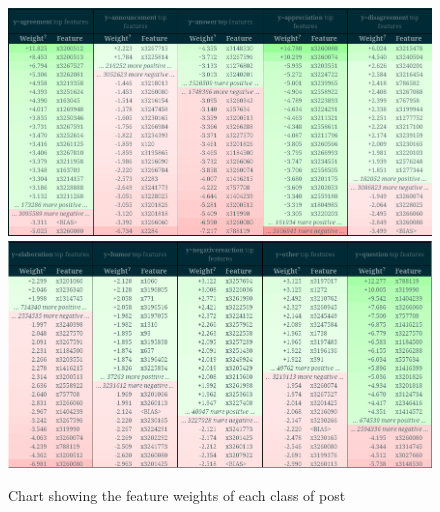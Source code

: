 \documentclass[10pt, a4paper]{article}
\begin{document}
\begin{figure}[H]
	\caption{Chart showing the feature weights of each class of post}
	\begin{center}
		\includegraphics[width=.8\linewidth]{q4_tab_1}
		\includegraphics[width=.8\linewidth]{q4_tab_2}
	\end{center}
\end{figure}
\end{document}
